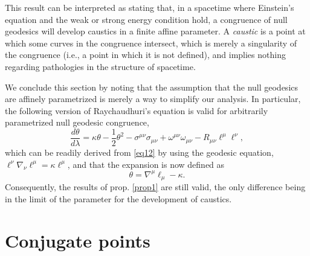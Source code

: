 \documentclass[
12pt,		%
openright,	%
twoside,  %
a4paper,			%
chapter=TITLE,		%
english,			%
french,				%
spanish,			%
brazil				%
]{USPSC-classe/USPSC}
\begin{document}
This result can be interpreted as stating that, in a spacetime where Einstein's equation and the weak or strong energy condition hold, a congruence of null geodesics will develop caustics in a finite affine parameter. A \textit{caustic} is a point at which some curves in the congruence intersect, which is merely a singularity of the congruence (i.e., a point in which it is not defined), and implies nothing regarding pathologies in the structure of spacetime.

We conclude this section by noting that the assumption that the null geodesics are affinely parametrized is merely a way to simplify our analysis. In particular, the following version of Raychaudhuri's equation is valid for arbitrarily parametrized null geodesic congruence, 
\begin{equation}\label{eqq2}
    \frac{d\theta}{d\lambda}=\kappa\theta-\frac{1}{2}\theta^2-\sigma^{\mu\nu}\sigma_{\mu\nu}+\omega^{\mu\nu}\omega_{\mu\nu}-R_{\mu\nu}\ell^{\mu}\ell^{\nu},
\end{equation}
which can be readily derived from \ref{eq12} by using the geodesic equation, $\ell^{\nu}\nabla_{\nu}\ell^{\mu}=\kappa\ell^{\mu}$, and that the expansion is now defined as 
\begin{equation}
    \theta=\nabla^{\mu}\ell_{\mu}-\kappa.
\end{equation}
Consequently, the results of prop. \ref{prop1} are still valid, the only difference being in the limit of the parameter for the development of caustics. 

\section{Conjugate points}\label{conj}
\end{document}
